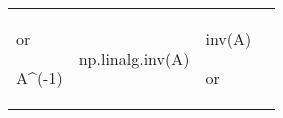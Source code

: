\documentclass[10pt, landscape]{article}
\newenvironment{Shaded}{}{}
\newcommand{\FloatTok}[1]{\textcolor[rgb]{0.25,0.63,0.44}{{#1}}}
\newcommand{\NormalTok}[1]{{#1}}
\begin{document}
\begin{multicols}{2}
\begin{tabular}[ ]{@{}llll@{}}
\begin{minipage}[t]{0.22\columnwidth}
or

\begin{Shaded}
\begin{Highlighting}[]
\NormalTok{A^(-}\FloatTok{1}\NormalTok{)}
\end{Highlighting}
\end{Shaded}
\strut
\end{minipage} & \begin{minipage}[t]{0.23\columnwidth}\raggedright\strut
\begin{Shaded}
\begin{Highlighting}[]
\NormalTok{np.linalg.inv(A)}
\end{Highlighting}
\end{Shaded}
\strut
\end{minipage} & \begin{minipage}[t]{0.20\columnwidth}\raggedright\strut
\begin{Shaded}
\begin{Highlighting}[]
\NormalTok{inv(A)}
\end{Highlighting}
\end{Shaded}

or


\end{minipage}
\end{tabular}
\end{multicols}
\end{document}
